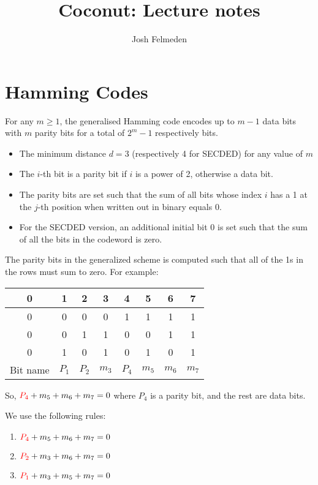 \documentclass[11pt,a4paper,titlepage,dvipsnames,cmyk]{scrartcl}
\title{Coconut: Lecture notes}
\author{Josh Felmeden}
\begin{document}
\maketitle
\tableofcontents

\newpage
\section{Hamming Codes}%
\label{sec:hamming-code}
For any $m \ge 1$, the generalised Hamming code encodes up to $m-1$ data
bits with $m$ parity bits for a total of $2^m-1$ respectively bits.
\begin{itemize}
    \item The minimum distance $d=3$ (respectively 4 for SECDED) for any
        value of $m$
    \item The $i$-th bit is a parity bit if $i$ is a power of 2, otherwise
        a data bit.
    \item The parity bits are set such that the sum of all bits whose
        index $i$ has a 1 at the $j$-th position when written out in
        binary equals 0.
    \item For the SECDED version, an additional initial bit 0 is set such
        that the sum of all the bits in the codeword is zero.
\end{itemize}

The parity bits in the generalized scheme is computed such that all of the
1s in the rows must sum to zero. For example:

\begin{center}
    \begin{tabular}{c|c c c c c c c}
        0 & 1 & 2 & 3 & 4 & 5 & 6 & 7 \\
        \hline
        0 & 0 & 0 & 0 & 1 & 1 & 1 & 1 \\
        0 & 0 & 1 & 1 & 0 & 0 & 1 & 1 \\
        0 & 1 & 0 & 1 & 0 & 1 & 0 & 1 \\
        \hline
        Bit name & $P_1$& $P_2$& $m_3$& $P_4$& $m_5$& $m_6$& $m_7$
    \end{tabular}
\end{center}

So, ${\color{red}{P_4}}+ m_5 + m_6 + m_7 = 0$ where
{\color{red} $P_4$} is a parity bit, and the rest are data bits.

We use the following rules:
\begin{enumerate}
    \item ${\color{red}P_4} + m_5 + m_6 + m_7 = 0$
    \item ${\color{red}P_2} + m_3 + m_6 + m_7 = 0$
    \item ${\color{red}P_1} + m_3 + m_5 + m_7 = 0$
\end{enumerate}
\end{document}
